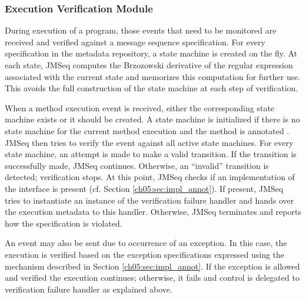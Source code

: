 \subsubsection{Execution Verification Module} \label{ch05:sec:exec_verify}

During execution of a program, those events that need to be monitored are received and
verified against a message sequence specification. 
For every specification in the metadata repository, a state machine is created on the fly.
At each state, JMSeq computes the Brzozowski derivative of the regular expression associated with the current state and memorizes this computation for further use. 
This avoids the full construction of the state machine at each step of verification. 

When a method execution event is received, either the corresponding state machine exists or it should be created.
A state machine is initialized if there is no state machine for the current method execution and the method is annotated  .
JMSeq then tries to verify the event against all active state machines.
For every state machine, an attempt is made to make a valid transition.
If the transition is successfully made, JMSeq continues.
Otherwise, an ``invalid'' transition is detected; verification stops.
At this point, JMSeq checks if an implementation of the
 interface is present (cf. Section \ref{ch05:sec:impl_annot}).
If present, JMSeq tries to instantiate an instance of the verification failure handler and hands over the execution metadata to this handler. 
Otherwise, JMSeq terminates and reports how the specification is violated.

An event may also be sent due to occurrence of an exception. 
In this case, the execution is verified based on the exception specifications expressed using the mechanism described in Section \ref{ch05:sec:impl_annot}. 
If the exception is allowed and verified the execution continues; otherwise, it fails and control is delegated to verification failure handler as explained above.


